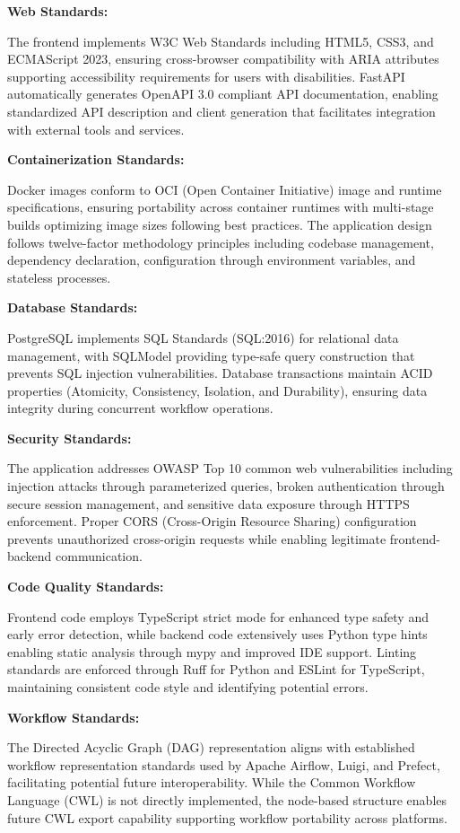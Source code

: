 \documentclass[12pt]{article}
\begin{document}
\textbf{Web Standards:}

The frontend implements W3C Web Standards including HTML5, CSS3, and ECMAScript 2023, ensuring cross-browser compatibility with ARIA attributes supporting accessibility requirements for users with disabilities. FastAPI automatically generates OpenAPI 3.0 compliant API documentation, enabling standardized API description and client generation that facilitates integration with external tools and services.

\textbf{Containerization Standards:}

Docker images conform to OCI (Open Container Initiative) image and runtime specifications, ensuring portability across container runtimes with multi-stage builds optimizing image sizes following best practices. The application design follows twelve-factor methodology principles including codebase management, dependency declaration, configuration through environment variables, and stateless processes.

\textbf{Database Standards:}

PostgreSQL implements SQL Standards (SQL:2016) for relational data management, with SQLModel providing type-safe query construction that prevents SQL injection vulnerabilities. Database transactions maintain ACID properties (Atomicity, Consistency, Isolation, and Durability), ensuring data integrity during concurrent workflow operations.

\textbf{Security Standards:}

The application addresses OWASP Top 10 common web vulnerabilities including injection attacks through parameterized queries, broken authentication through secure session management, and sensitive data exposure through HTTPS enforcement. Proper CORS (Cross-Origin Resource Sharing) configuration prevents unauthorized cross-origin requests while enabling legitimate frontend-backend communication.

\textbf{Code Quality Standards:}

Frontend code employs TypeScript strict mode for enhanced type safety and early error detection, while backend code extensively uses Python type hints enabling static analysis through mypy and improved IDE support. Linting standards are enforced through Ruff for Python and ESLint for TypeScript, maintaining consistent code style and identifying potential errors.

\textbf{Workflow Standards:}

The Directed Acyclic Graph (DAG) representation aligns with established workflow representation standards used by Apache Airflow, Luigi, and Prefect, facilitating potential future interoperability. While the Common Workflow Language (CWL) is not directly implemented, the node-based structure enables future CWL export capability supporting workflow portability across platforms.
\end{document}
